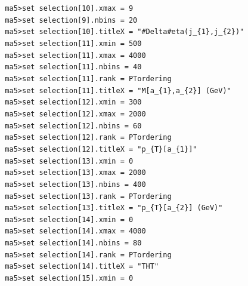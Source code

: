 \documentclass[a4paper, 10pt]{article}
\begin{document}
\texttt{ }\texttt{ }\texttt{ma5>set selection[10].xmax = 9\\
}
\texttt{ }\texttt{ }\texttt{ma5>set selection[9].nbins = 20\\
}
\texttt{ }\texttt{ }\texttt{ma5>set selection[10].titleX = "\#Delta\#eta(j\_\{1\},j\_\{2\})"\\
}
\texttt{ }\texttt{ }\texttt{ma5>set selection[11].xmin = 500\\
}
\texttt{ }\texttt{ }\texttt{ma5>set selection[11].xmax = 4000\\
}
\texttt{ }\texttt{ }\texttt{ma5>set selection[11].nbins = 40\\
}
\texttt{ }\texttt{ }\texttt{ma5>set selection[11].rank = PTordering\\
}
\texttt{ }\texttt{ }\texttt{ma5>set selection[11].titleX = "M[a\_\{1\},a\_\{2\}] (GeV)"\\
}
\texttt{ }\texttt{ }\texttt{ma5>set selection[12].xmin = 300\\
}
\texttt{ }\texttt{ }\texttt{ma5>set selection[12].xmax = 2000\\
}
\texttt{ }\texttt{ }\texttt{ma5>set selection[12].nbins = 60\\
}
\texttt{ }\texttt{ }\texttt{ma5>set selection[12].rank = PTordering\\
}
\texttt{ }\texttt{ }\texttt{ma5>set selection[12].titleX = "p\_\{T\}[a\_\{1\}]"\\
}
\texttt{ }\texttt{ }\texttt{ma5>set selection[13].xmin = 0\\
}
\texttt{ }\texttt{ }\texttt{ma5>set selection[13].xmax = 2000\\
}
\texttt{ }\texttt{ }\texttt{ma5>set selection[13].nbins = 400\\
}
\texttt{ }\texttt{ }\texttt{ma5>set selection[13].rank = PTordering\\
}
\texttt{ }\texttt{ }\texttt{ma5>set selection[13].titleX = "p\_\{T\}[a\_\{2\}] (GeV)"\\
}
\texttt{ }\texttt{ }\texttt{ma5>set selection[14].xmin = 0\\
}
\texttt{ }\texttt{ }\texttt{ma5>set selection[14].xmax = 4000\\
}
\texttt{ }\texttt{ }\texttt{ma5>set selection[14].nbins = 80\\
}
\texttt{ }\texttt{ }\texttt{ma5>set selection[14].rank = PTordering\\
}
\texttt{ }\texttt{ }\texttt{ma5>set selection[14].titleX = "THT"\\
}
\texttt{ }\texttt{ }\texttt{ma5>set selection[15].xmin = 0\\
}
\end{document}
